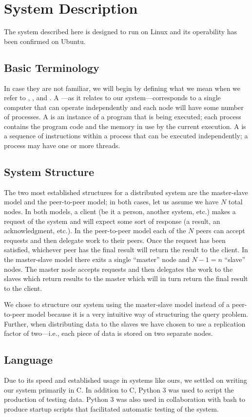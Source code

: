\section{System Description}
The system described here is designed to run on Linux and its operability has been confirmed on Ubuntu.
\subsection{Basic Terminology}
In case they are not familiar, we will begin by defining what we mean when we refer to , , and .
A ---as it relates to our system---corresponds to a single computer that can operate independently and each node will have some number of processes.
A  is an instance of a program that is being executed; each process contains the program code and the memory in use by the current execution.
A  is a sequence of instructions within a process that can be executed independently; a process may have one or more threads.
\subsection{System Structure}
The two most established structures for a distributed system are the master-slave model and the peer-to-peer model; in both cases, let us assume we have \(N\) total nodes.
In both models, a client (be it a person, another system, etc.) makes a request of the system and will expect some sort of response (a result, an acknowledgment, etc.).
In the peer-to-peer model each of the \(N\) peers can accept requests and then delegate work to their peers.
Once the request has been satisfied, whichever peer has the final result will return the result to the client.
In the master-slave model there exits a single ``master'' node and \(N - 1 = n\) ``slave'' nodes.
The master node accepts requests and then delegates the work to the slaves which return results to the master which will in turn return the final result to the client.
\par
We chose to structure our system using the master-slave model instead of a peer-to-peer model because it is a very intuitive way of structuring the query problem.
Further, when distributing data to the slaves we have chosen to use a replication factor of two---i.e., each piece of data is stored on two separate nodes.
\subsection{Language}
Due to its speed and established usage in systems like ours, we settled on writing our system primarily in C.
In addition to C, Python 3 was used to script the production of testing data.
Python 3 was also used in collaboration with bash to produce startup scripts that facilitated automatic testing of the system.
